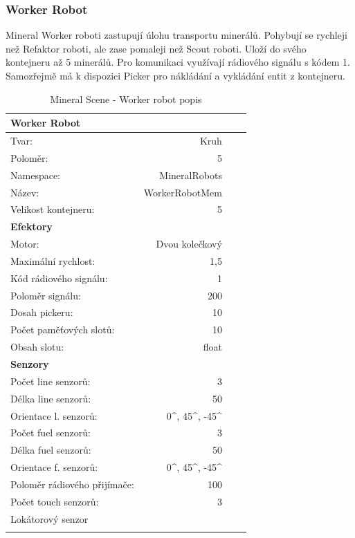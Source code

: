 \subsubsection{Worker Robot}
Mineral Worker roboti zastupují úlohu transportu minerálů. Pohybují se rychleji než Refaktor roboti, ale zase pomaleji než Scout roboti. Uloží do svého kontejneru až 5 minerálů. Pro komunikaci využívají rádiového signálu s kódem 1. Samozřejmě má k dispozici Picker pro nákládání a vykládání entit z kontejneru.
\begin{table}[h]\centering
	\begin{tabular}{l@{\hspace{1.0cm}}D{.}{,}{2.2}D{.}{,}{2.2}D{.}{,}{2.3}}
		\toprule
		\textbf{Worker Robot} \\
		\midrule
		Tvar: & Kruh\\
		Poloměr: & 5 \\
		Namespace: & MineralRobots\\
		Název: & WorkerRobotMem \\
		Velikost kontejneru: & 5\\
		\midrule
		\textbf{Efektory} \\
		\midrule
		Motor: & Dvou kolečkový \\
		Maximální rychlost: & 1,5 \\
		Kód rádiového signálu: & 1\\
		Poloměr signálu: & 200\\
		Dosah pickeru: & 10\\
		Počet paměťových slotů: &10 \\
		Obsah slotu: & float\\
		\midrule 
		\textbf{Senzory} \\
		\midrule
		Počet line senzorů: &  3\\
		Délka line senzorů: & 50\\
		Orientace l. senzorů: & 0^\circ, 45^\circ, -45^\circ\\
		Počet fuel senzorů: &  3\\
		Délka fuel senzorů: & 50\\
		Orientace f. senzorů: & 0^\circ, 45^\circ, -45^\circ\\
		Poloměr rádiového přijímače: & 100 \\
		Počet touch senzorů: & 3 \\  
		Lokátorový senzor\\ 
		\bottomrule
	\end{tabular}
	\caption{Mineral Scene - Worker robot popis }
	\label{tab04:MineralWorker}
\end{table}
\clearpage
